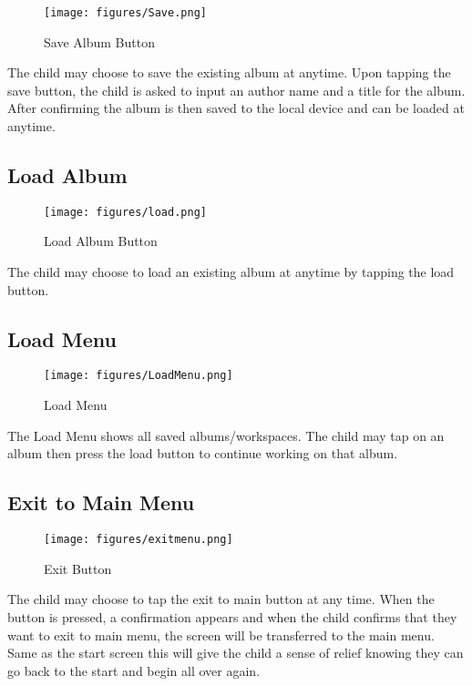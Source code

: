 \begin{figure}[H]
    \centering
    \texttt{[image: figures/Save.png]}
    \caption{Save Album Button}
    \label{fig:firefly2}
\end{figure}
The child may choose to save the existing album at anytime. Upon tapping the save button, the child is asked to input an author name and a title for the album. After confirming the album is then saved to the local device and can be loaded at anytime.
\subsection{Load Album}

\begin{figure}[H]
    \centering
    \texttt{[image: figures/load.png]}
    \caption{Load Album Button}
    \label{fig:firefly2}
\end{figure}

The child may choose to load an existing album at anytime by tapping the load button.

\subsection{Load Menu}

\begin{figure}[H]
    \centering
    \texttt{[image: figures/LoadMenu.png]}
    \caption{Load Menu}
    \label{fig:loadmenu}
\end{figure}

The Load Menu shows all saved albums/workspaces. The child may tap on an album then press the load button to continue working on that album.

\subsection{Exit to Main Menu}

\begin{figure}[H]
    \centering
    \texttt{[image: figures/exitmenu.png]}
    \caption{Exit Button}
    \label{fig:exitbutton}
\end{figure}

The child may choose to tap the exit to main button at any time. When the button is pressed, a confirmation appears and when the child confirms that they want to exit to main menu, the screen will be transferred to the main menu. Same as the start screen this will give the child a sense of relief knowing they can go back to the start and begin all over again.